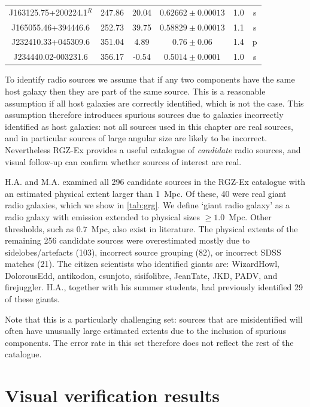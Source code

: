 \begin{table}
\begin{footnotesize}
\begin{tabular}{c|ccccc}
    J163125.75+200224.1${}^R$ & 247.86 & 20.04 & $0.62662 \pm 0.00013$ & 1.0 & s\\ %
    J165055.46+394446.6 & 252.73 & 39.75 & $0.58829 \pm 0.00013$ & 1.1 & s\\ %
    J232410.33+045309.6 & 351.04 & 4.89 & $0.76 \pm 0.06$ & 1.4 & p\\ %
    J234440.02-003231.6 & 356.17 & -0.54 & $0.5014 \pm 0.0001$ & 1.0 & s\\ %
      \hline
      \end{tabular}\end{footnotesize}
    \end{table}

    To identify radio sources we assume that if any two components have the same host galaxy then they are part of the same source. This is a reasonable assumption if all host galaxies are correctly identified, which is not the case. This assumption therefore introduces spurious sources due to galaxies incorrectly identified as host galaxies: not all sources used in this chapter are real sources, and in particular sources of large angular size are likely to be incorrect. Nevertheless RGZ-Ex provides a useful catalogue of \emph{candidate} radio sources, and visual follow-up can confirm whether sources of interest are real.

    H.A. and M.A. examined all 296 candidate sources in the RGZ-Ex catalogue with an estimated physical extent larger than 1~Mpc. Of these, 40 were real giant radio galaxies, which we show in \autoref{tab:grg}. We define `giant radio galaxy' as a radio galaxy with emission extended to physical sizes $\geq 1.0$~Mpc. Other thresholds, such as $0.7$~Mpc, also exist in literature. The physical extents of the remaining 256 candidate sources were overestimated
mostly due to sidelobes/artefacts (103), incorrect source grouping (82), or incorrect SDSS matches (21). The citizen scientists who identified giants are: WizardHowl, DolorousEdd, antikodon, csunjoto, sisifolibre, JeanTate, JKD, PADV, and firejuggler. H.A., together with his summer students, had previously identified 29 of these giants.

    Note that this is a particularly challenging set: sources that are misidentified will often have unusually large estimated extents due to the inclusion of spurious components. The error rate in this set therefore does not reflect the rest of the catalogue.

\section{Visual verification results}
\label{sec:verification-appendix}
  

